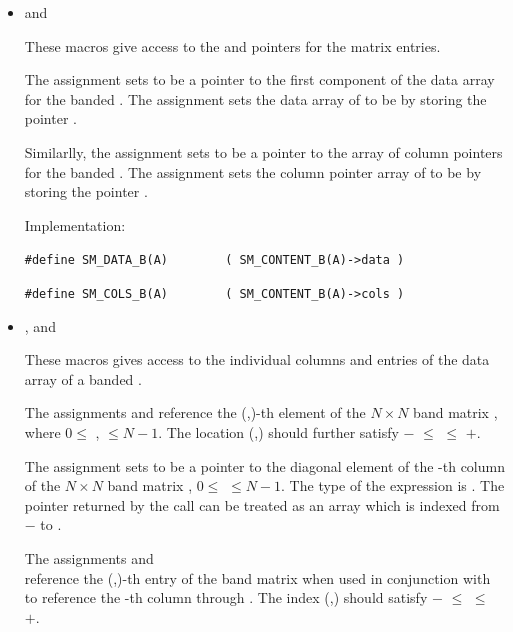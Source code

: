 \begin{itemize}
\item {} and 
                                                            
  These macros give access to the  and  pointers for
  the matrix entries.

  The assignment  sets  to be     
  a pointer to the first component of the data array for the
  banded  .  The assignment  sets the data array of  to be  by storing
  the pointer . 
  
  Similarlly, the assignment  sets  to be     
  a pointer to the array of column pointers for the banded  . 
  The assignment  sets the column pointer
  array of  to be  by storing the pointer .                   
  
  Implementation:

  \verb|#define SM_DATA_B(A)        ( SM_CONTENT_B(A)->data )|

  \verb|#define SM_COLS_B(A)        ( SM_CONTENT_B(A)->cols )|


\item {},  and 
                                                            
  These macros gives access to the individual columns and entries of
  the data array of a banded .

  The assignments  and  reference the (,)-th element of the
  $N \times N$ band matrix , where $0 \le$ ,  $\le N-1$.
  The location (,) should further satisfy 
  $-$ $\le$  $\le$ $+$.

  The assignment  sets  to be
  a pointer to the diagonal element of the -th column of the
  $N \times N$ band matrix , $0 \le$  $\le N-1$. 
  The type of the expression  is . 
  The pointer returned by the call  can be treated as 
  an array which is indexed from $-$ to .

  The assignments  and\\
   reference the
  (,)-th entry of the band matrix  when used in
  conjunction with  to reference the -th column
  through . The index (,) should satisfy 
  $-$ $\le$  $\le$ $+$.


\end{itemize}
